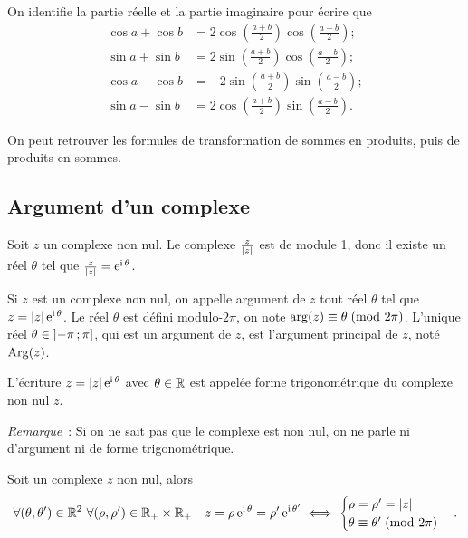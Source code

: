 On identifie la partie réelle et la partie imaginaire pour écrire que
\begin{align}
    \cos a + \cos b &= 2 \cos \left( \frac{a + b}{2} \right) \cos 
    \left(\frac{a-b}{2} \right);\\
    \sin a + \sin b &= 2 \sin \left( \frac{a + b}{2} \right) \cos 
    \left(\frac{a-b}{2} \right);\\
    \cos a - \cos b &= -2 \sin \left( \frac{a + b}{2} \right) \sin 
    \left(\frac{a-b}{2} \right);\\
    \sin a - \sin b &= 2 \cos \left( \frac{a + b}{2} \right) \sin 
    \left(\frac{a-b}{2} \right).
\end{align}

On peut retrouver les formules de transformation de sommes en produits, puis de 
produits en sommes.

\subsection{Argument d'un complexe}
\label{subsec:argumentcomplexe}

Soit \(z\) un complexe non nul. Le complexe \(\frac{z}{\left\lvert z\right\rvert}\) est de module 
1, donc il existe un réel \(\theta\) tel que 
\(\frac{z}{\left\lvert z\right\rvert} = \operatorname{e}^{\operatorname{i} \theta}\).

\begin{defdef}
    Si \(z\) est un complexe non nul, on appelle argument de \(z\) tout réel 
    \(\theta\) tel que \(z = \left\lvert z\right\rvert \operatorname{e}^{\operatorname{i} \theta}\).  Le réel \(\theta\) est 
    défini modulo-\(2\pi\), on note \(\arg(z) \equiv \theta\!\pmod {2\pi}\). L'unique 
    réel \(\theta \in \left] -\pi \, ;  \pi \right]\), qui est un argument de \(z\), 
    est l'argument principal de \(z\), noté \(\operatorname{Arg}(z)\).
\end{defdef}

L'écriture \(z = \left\lvert z\right\rvert \operatorname{e}^{\operatorname{i} \theta}\) avec \(\theta \in \mathbb{R}\) est appelée 
forme trigonométrique du complexe non nul \(z\).

\emph{Remarque}~: Si on ne sait pas que le complexe est non nul, on ne parle ni 
d'argument ni de forme trigonométrique.

\begin{prop}
    Soit un complexe \(z\) non nul, alors
    \begin{equation}
        \forall (\theta, \theta') \in \mathbb{R}^2 \ \forall (\rho, \rho') \in \mathbb{R}_{+} 
        \times \mathbb{R}_{+} \quad z = \rho \operatorname{e}^{\operatorname{i} \theta} = \rho' \operatorname{e}^{\operatorname{i} \theta'} 
        \iff
        \begin{cases}
            \rho = \rho' = \left\lvert z\right\rvert \\
            \theta \equiv \theta'\!\pmod {2\pi}
        \end{cases}.
    \end{equation}
\end{prop}

